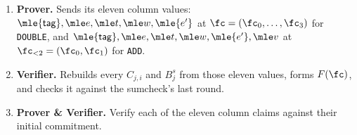 \begin{enumerate}[itemsep=1pt,topsep=3pt]
They run over different cubes, $\cube{4}$ for \texttt{DOUBLE} and $\cube{2}$ for \texttt{ADD}, so \texttt{ADD}'s part is multiplied by $X_2X_3$, the two variables it does not use, whose sum over $\cube{2}$ is $1$ and so leaves its own sum untouched:
\begin{align*}
  F(X_0,\dots,X_3)&=\eq\bigl(\zeta_{<4},(X_0,\dots,X_3)\bigr)\Bigl(\xi^{0}B^{\push}_{1}+\xi^{1}B^{\pull}_{1}+\xi^{2}C_{1,1}+\xi^{3}C_{1,2}\Bigr)\\
                  &\quad+\eq\bigl(\zeta_{<2},(X_0,X_1)\bigr)\Bigl(\xi^{0}B^{\push}_{2}+\xi^{1}B^{\pull}_{2}+\xi^{4}C_{2,1}+\xi^{5}C_{2,2}+\xi^{6}C_{2,3}\Bigr)X_2X_3 .
\end{align*}
One sumcheck over $\cube{4}$ then proves all seven claims at once:
\[
  \sum_{x\in\cube{4}}F(x)\qeq\xi^{0}\mathsf{rem}_{\push}+\xi^{1}\mathsf{rem}_{\pull}.
\]
\item \textbf{Prover.} Sends its eleven column values: $\mle{\mathsf{tag}},\mle e,\mle t,\mle w,\mle{e'}$ at $\fc=(\fc_0,\dots,\fc_3)$ for \texttt{DOUBLE}, and $\mle{\mathsf{tag}},\mle e,\mle t,\mle w,\mle{e'},\mle v$ at $\fc_{<2}=(\fc_0,\fc_1)$ for \texttt{ADD}.
\item \textbf{Verifier.} Rebuilds every $C_{j,i}$ and $B^{s}_{j}$ from those eleven values, forms $F(\fc)$, and checks it against the sumcheck's last round.
\item \textbf{Prover \& Verifier.} Verify each of the eleven column claims against their initial commitment.
\end{enumerate}
